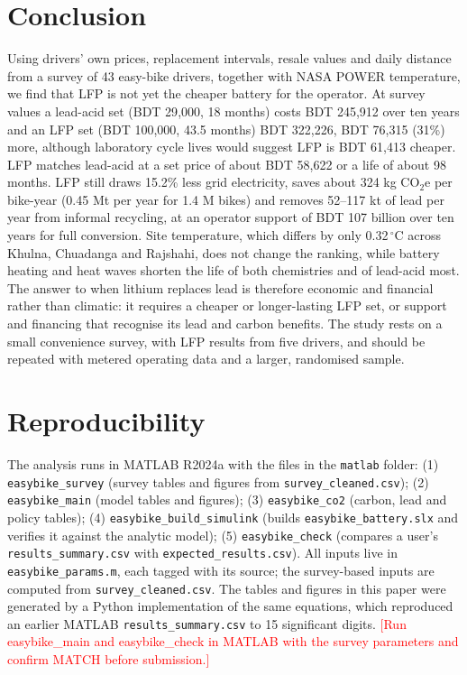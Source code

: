 \documentclass[11pt,a4paper]{article}
\newcommand{\todo}[1]{\textcolor{red}{#1}}%
\newcommand{\nSurvey}{43}
\newcommand{\costMedLA}{29{,}000}
\newcommand{\replMedLA}{18}
\newcommand{\costMedLFP}{100{,}000}
\newcommand{\replMedLFP}{43.5}
\newcommand{\tcoLA}{245{,}912}
\newcommand{\tcoLFP}{322{,}226}
\newcommand{\gapLFP}{76{,}315}
\newcommand{\gapPct}{31}
\newcommand{\gridratio}{15.2}
\newcommand{\Tspread}{0.32}
\newcommand{\litGap}{61{,}413}
\newcommand{\beP}{58{,}622}
\newcommand{\beL}{98}
\newcommand{\saveBike}{324}
\newcommand{\fleetA}{0.45}
\newcommand{\leadLow}{52}
\newcommand{\leadHigh}{117}
\newcommand{\suppFull}{107}
\begin{document}
\section{Conclusion}
\label{sec:concl}
Using drivers' own prices, replacement intervals, resale values and daily distance from a survey of \nSurvey{} easy-bike drivers, together with NASA POWER temperature, we find that LFP is not yet the cheaper battery for the operator. At survey values a lead-acid set (BDT \costMedLA{}, \replMedLA{} months) costs BDT \tcoLA{} over ten years and an LFP set (BDT \costMedLFP{}, \replMedLFP{} months) BDT \tcoLFP{}, BDT \gapLFP{} (\gapPct\%) more, although laboratory cycle lives would suggest LFP is BDT \litGap{} cheaper. LFP matches lead-acid at a set price of about BDT \beP{} or a life of about \beL{} months. LFP still draws \gridratio\% less grid electricity, saves about \saveBike{} kg CO$_2$e per bike-year (\fleetA{} Mt per year for 1.4 M bikes) and removes \leadLow--\leadHigh{} kt of lead per year from informal recycling, at an operator support of BDT \suppFull{} billion over ten years for full conversion. Site temperature, which differs by only \Tspread\,$^\circ$C across Khulna, Chuadanga and Rajshahi, does not change the ranking, while battery heating and heat waves shorten the life of both chemistries and of lead-acid most. The answer to when lithium replaces lead is therefore economic and financial rather than climatic: it requires a cheaper or longer-lasting LFP set, or support and financing that recognise its lead and carbon benefits. The study rests on a small convenience survey, with LFP results from five drivers, and should be repeated with metered operating data and a larger, randomised sample.

\section{Reproducibility}
\label{sec:repro}
The analysis runs in MATLAB R2024a with the files in the \texttt{matlab} folder: (1) \texttt{easybike\_survey} (survey tables and figures from \texttt{survey\_cleaned.csv}); (2) \texttt{easybike\_main} (model tables and figures); (3) \texttt{easybike\_co2} (carbon, lead and policy tables); (4) \texttt{easybike\_build\_simulink} (builds \texttt{easybike\_battery.slx} and verifies it against the analytic model); (5) \texttt{easybike\_check} (compares a user's \texttt{results\_summary.csv} with \texttt{expected\_results.csv}). All inputs live in \texttt{easybike\_params.m}, each tagged with its source; the survey-based inputs are computed from \texttt{survey\_cleaned.csv}. The tables and figures in this paper were generated by a Python implementation of the same equations, which reproduced an earlier MATLAB \texttt{results\_summary.csv} to 15 significant digits. \todo{[Run easybike\_main and easybike\_check in MATLAB with the survey parameters and confirm MATCH before submission.]}
\end{document}
